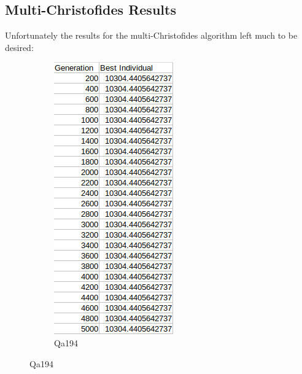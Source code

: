 \documentclass[11pt,a4paper,titlepage]{article}
\begin{document}
\subsection{Multi-Christofides Results}

Unfortunately the results for the multi-Christofides algorithm left much to be desired:

\begin{figure}[ht]
	\begin{subfigure}{.32\textwidth}
		\centering
		\includegraphics[width=.75\textwidth]{MultQa194}
		\caption{Qa194}

\end{subfigure}
\end{figure}
\end{document}
